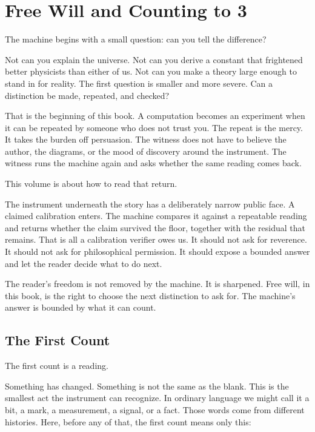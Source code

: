 \chapter*{Free Will and Counting to 3}

The machine begins with a small question: can you tell the difference?

Not can you explain the universe. Not can you derive a constant that
frightened better physicists than either of us. Not can you make a
theory large enough to stand in for reality. The first question is
smaller and more severe. Can a distinction be made, repeated, and
checked?

That is the beginning of this book. A computation becomes an experiment
when it can be repeated by someone who does not trust you. The repeat is
the mercy. It takes the burden off persuasion. The witness does not have
to believe the author, the diagrams, or the mood of discovery around the
instrument. The witness runs the machine again and asks whether the same
reading comes back.

This volume is about how to read that return.

The instrument underneath the story has a deliberately narrow public
face. A claimed calibration enters. The machine compares it against a
repeatable reading and returns whether the claim survived the floor,
together with the residual that remains. That is all a calibration
verifier owes us. It should not ask for reverence. It should not ask for
philosophical permission. It should expose a bounded answer and let the
reader decide what to do next.

The reader's freedom is not removed by the machine. It is sharpened.
Free will, in this book, is the right to choose the next distinction to
ask for. The machine's answer is bounded by what it can count.

\section*{The First Count}

The first count is a reading.

Something has changed. Something is not the same as the blank. This is
the smallest act the instrument can recognize. In ordinary language we
might call it a bit, a mark, a measurement, a signal, or a fact. Those
words come from different histories. Here, before any of that, the first
count means only this:

